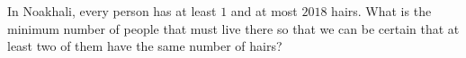 In Noakhali, every person has at least $1$ and at most $2018$ hairs. What is the minimum number of people that must live there so that we can be certain that at least two of them have the same number of hairs?
